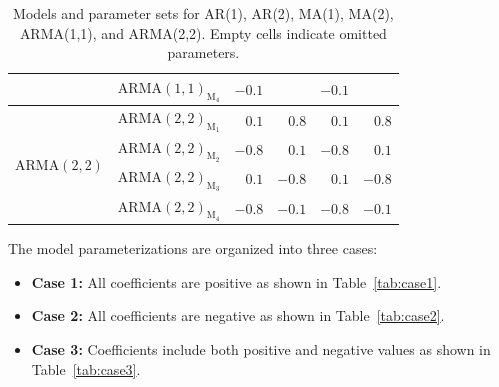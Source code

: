 \documentclass[12pt,a4paper]{article}
\begin{document}
\begin{table}[H]
\begin{tabular}{llrrrr}
			& $\mathrm{ARMA}(1,1)_{\textrm{M}_4}$ & $-0.1$ &     & $-0.1$ &      \\
			\midrule
			\multirow{4}[2]{*}{$\mathrm{ARMA}(2,2)$}  & $\mathrm{ARMA}(2,2)_{\textrm{M}_1}$ & $0.1$ & $0.8$  & $0.1$  & $0.8$  \\
			& $\mathrm{ARMA}(2,2)_{\textrm{M}_2}$ & $-0.8$ & $0.1$ & $-0.8$ & $0.1$  \\
			& $\mathrm{ARMA}(2,2)_{\textrm{M}_3}$ & $0.1$ & $-0.8$ & $0.1$  & $-0.8$ \\
			& $\mathrm{ARMA}(2,2)_{\textrm{M}_4}$ & $-0.8$ & $-0.1$ & $-0.8$ & $-0.1$ \\
			\bottomrule
		\end{tabular}
		\caption{Models and parameter sets for AR(1), AR(2), MA(1), MA(2), ARMA(1,1), and ARMA(2,2). Empty cells indicate omitted parameters.}
		\label{tab:parameterSetting}
	\end{table}
	
	The model parameterizations are organized into three cases:
	\begin{itemize}
		\item \textbf{Case 1:} All coefficients are positive as shown in Table~\ref{tab:case1}.
		\item \textbf{Case 2:} All coefficients are negative as shown in Table~\ref{tab:case2}.
		\item \textbf{Case 3:} Coefficients include both positive and negative values as shown in Table~\ref{tab:case3}.
	\end{itemize}
	
\end{document}
